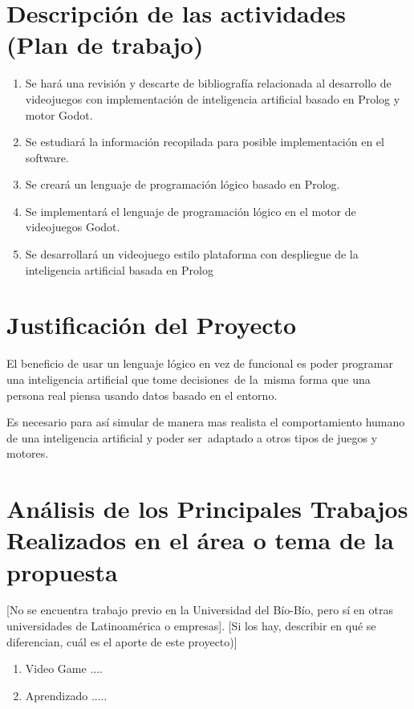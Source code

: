 \documentclass[spanish]{article}
\begin{document}
\section{Descripción de las actividades (Plan de trabajo)}

\begin{enumerate}
	\item Se hará una revisión y descarte de bibliografía relacionada al desarrollo de videojuegos con implementación de inteligencia artificial basado en Prolog y motor Godot.
	\item Se estudiará la información recopilada para posible implementación en el software.
	\item Se creará un lenguaje de programación lógico basado en Prolog.
	\item Se implementará el lenguaje de programación lógico en el motor de videojuegos Godot.
	\item Se desarrollará un videojuego estilo plataforma con despliegue de la inteligencia artificial basada en Prolog 
\end{enumerate}


\section{Justificación del Proyecto}

El beneficio de usar un lenguaje lógico en vez de funcional es poder programar una inteligencia artificial que tome decisiones\
de la\
misma forma que una persona real piensa usando datos basado en el entorno.

Es necesario para así simular de manera mas realista el comportamiento humano de una inteligencia artificial y poder ser\
adaptado a otros tipos de juegos y motores.

\section{Análisis de los Principales Trabajos Realizados en el área o tema de la propuesta }

[No se encuentra trabajo previo en la Universidad del Bío-Bío, pero sí en otras universidades de Latinoamérica o empresas].
[Si los hay, describir en qué se diferencian, cuál es el aporte de este proyecto)]

	\begin{enumerate}
		\item Video Game ....
		\item Aprendizado .....

	\end{enumerate}
\end{document}
